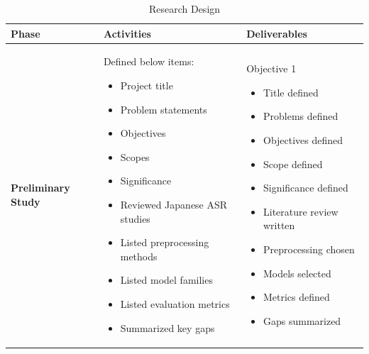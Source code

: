 \begin{table}[H]
\centering
\caption{Research Design} 
\label{tab:projectOverview}
{\small
\setlength{\tabcolsep}{6pt}
\renewcommand{\arraystretch}{1.5}

\begin{tabular}{ p{2.8cm}  p{5.3cm}  p{5.3cm}  }
\hline
\textbf{Phase} & \textbf{Activities} & \textbf{Deliverables} \\
\hline 

\textbf{Preliminary Study} &
Defined below items:
\begin{itemize}[leftmargin=*, nosep]
  \item Project title
  \item Problem statements
  \item Objectives
  \item Scopes
  \item Significance
  \item Reviewed Japanese ASR studies
  \item Listed preprocessing methods
  \item Listed model families
  \item Listed evaluation metrics
  \item Summarized key gaps
\end{itemize}
&
Objective 1
\begin{itemize}[leftmargin=*, nosep]
  \item Title defined
  \item Problems defined
  \item Objectives defined
  \item Scope defined
  \item Significance defined
  \item Literature review written
  \item Preprocessing chosen
  \item Models selected
  \item Metrics defined
  \item Gaps summarized
\end{itemize}
\\ \hline


\end{tabular}}
\end{table}
